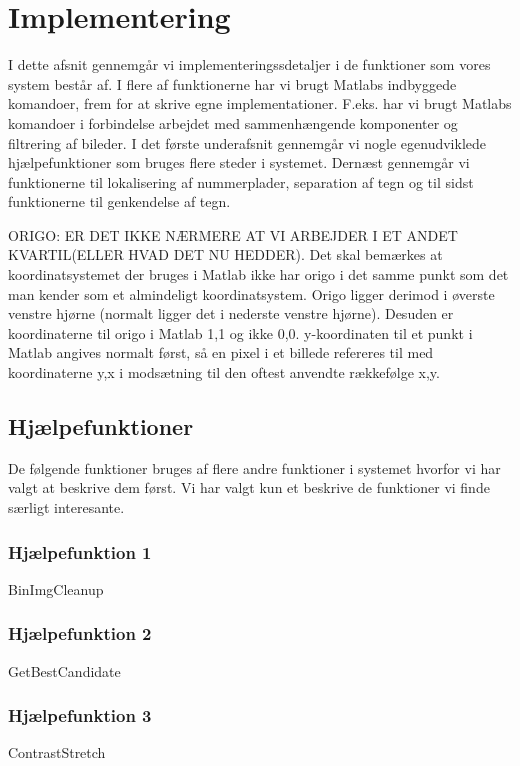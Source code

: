 \section{Implementering}
\label{sec:implementation}

I dette afsnit gennemgår vi implementeringssdetaljer i de funktioner som vores system består af. I flere af funktionerne har vi brugt Matlabs indbyggede komandoer, frem for at skrive egne implementationer. F.eks. har vi brugt Matlabs komandoer i forbindelse arbejdet med sammenhængende komponenter og filtrering af bileder. I det første underafsnit gennemgår vi nogle egenudviklede hjælpefunktioner som bruges flere steder i systemet. Dernæst gennemgår vi funktionerne til lokalisering af nummerplader, separation af tegn og til sidst funktionerne til genkendelse af tegn.

ORIGO: ER DET IKKE NÆRMERE AT VI ARBEJDER I ET ANDET KVARTIL(ELLER HVAD DET NU HEDDER).
Det skal bemærkes at koordinatsystemet der bruges i Matlab ikke har origo i det samme punkt som det man kender som et almindeligt koordinatsystem. Origo ligger derimod i øverste venstre hjørne (normalt ligger det i nederste venstre hjørne). Desuden er koordinaterne til origo i Matlab 1,1 og ikke 0,0. y-koordinaten til et punkt i Matlab angives normalt først, så en pixel i et billede refereres til med koordinaterne y,x i modsætning til den oftest anvendte rækkefølge x,y.


\subsection{Hjælpefunktioner}
De følgende funktioner bruges af flere andre funktioner i systemet hvorfor vi har valgt at beskrive dem først. Vi har valgt kun et beskrive de funktioner vi finde særligt interesante.

\subsubsection{Hjælpefunktion 1}
BinImgCleanup
\subsubsection{Hjælpefunktion 2}
GetBestCandidate
\subsubsection{Hjælpefunktion 3}
\label{sec:imp:ContrastStrech}
ContrastStretch
